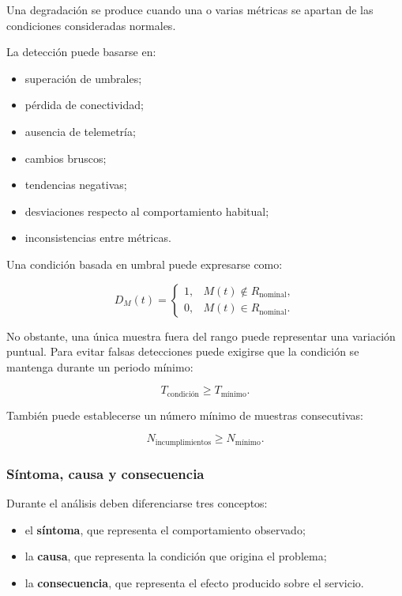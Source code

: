 Una degradación se produce cuando una o varias métricas se apartan de las
condiciones consideradas normales.

La detección puede basarse en:

\begin{itemize}
    \item superación de umbrales;

    \item pérdida de conectividad;

    \item ausencia de telemetría;

    \item cambios bruscos;

    \item tendencias negativas;

    \item desviaciones respecto al comportamiento habitual;

    \item inconsistencias entre métricas.
\end{itemize}

Una condición basada en umbral puede expresarse como:

\[
    D_M(t)
    =
    \begin{cases}
        1, &
        M(t)
        \notin
        R_{\mathrm{nominal}},\\
        0, &
        M(t)
        \in
        R_{\mathrm{nominal}}.
    \end{cases}
\]

No obstante, una única muestra fuera del rango puede representar una
variación puntual. Para evitar falsas detecciones puede exigirse que la
condición se mantenga durante un periodo mínimo:

\[
    T_{\mathrm{condición}}
    \geq
    T_{\mathrm{mínimo}}.
\]

También puede establecerse un número mínimo de muestras consecutivas:

\[
    N_{\mathrm{incumplimientos}}
    \geq
    N_{\mathrm{mínimo}}.
\]


\subsubsection*{Síntoma, causa y consecuencia}

Durante el análisis deben diferenciarse tres conceptos:

\begin{itemize}
    \item el \textbf{síntoma}, que representa el comportamiento
    observado;

    \item la \textbf{causa}, que representa la condición que origina el
    problema;

    \item la \textbf{consecuencia}, que representa el efecto producido
    sobre el servicio.
\end{itemize}

